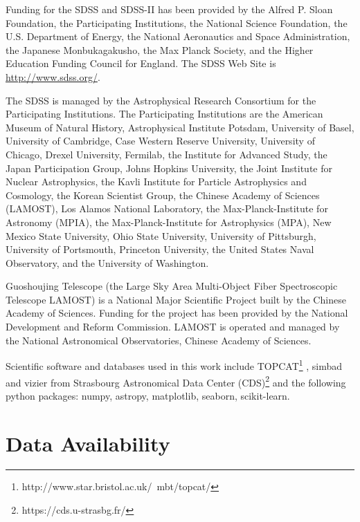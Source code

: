 \documentclass[fleqn,usenatbib]{mnras}
\begin{document}
Funding for the SDSS and SDSS-II has been provided by the Alfred P.
Sloan Foundation, the Participating Institutions, the National Science
Foundation, the U.S. Department of Energy, the National Aeronautics
and Space Administration, the Japanese Monbukagakusho, the Max
Planck Society, and the Higher Education Funding Council for England.
The SDSS Web Site is \url{http://www.sdss.org/}.

The SDSS is managed by the Astrophysical Research Consortium for
the Participating Institutions. The Participating Institutions
are the American Museum of Natural History, Astrophysical Institute Potsdam,
University of Basel, University of Cambridge, Case Western Reserve University,
University of Chicago, Drexel University, Fermilab, the Institute for Advanced
Study, the Japan Participation Group, Johns Hopkins University, the Joint
Institute for Nuclear Astrophysics, the Kavli Institute for Particle Astrophysics
and Cosmology, the Korean Scientist Group, the Chinese Academy of Sciences (LAMOST),
Los Alamos National Laboratory, the Max-Planck-Institute for Astronomy (MPIA),
the Max-Planck-Institute for Astrophysics (MPA), New Mexico State University,
Ohio State University, University of Pittsburgh, University of Portsmouth,
Princeton University, the United States Naval Observatory, and the University
of Washington.

Guoshoujing Telescope (the Large Sky Area Multi-Object Fiber Spectroscopic
Telescope LAMOST) is a National Major Scientific Project built by the Chinese
Academy of Sciences. Funding for the project has been provided by the National
Development and Reform Commission. LAMOST is operated and managed by the
National Astronomical Observatories, Chinese Academy of Sciences. 

Scientific software
and databases used in this work include 
TOPCAT\footnote{http://www.star.bristol.ac.uk/~mbt/topcat/} \citep{Taylor:2005}, 
simbad and vizier from Strasbourg Astronomical Data Center (CDS)\footnote{https://cds.u-strasbg.fr/} 
and the following  python packages: numpy, astropy, matplotlib, seaborn, scikit-learn.

\section*{Data Availability}



\end{document}
